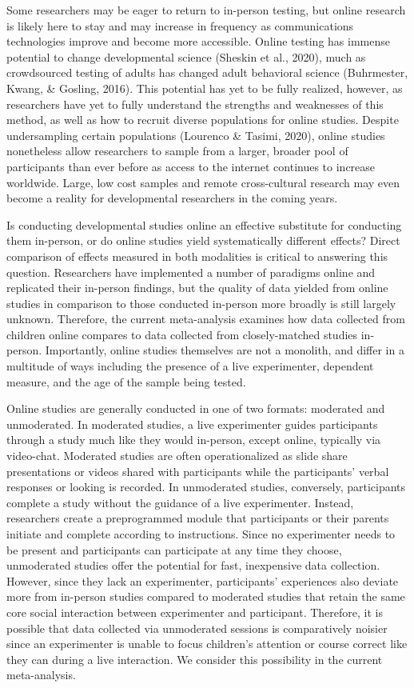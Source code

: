 \documentclass[
  man,floatsintext]{apa6}
\begin{document}
Some researchers may be eager to return to in-person testing, but online research is likely here to stay and may increase in frequency as communications technologies improve and become more accessible. Online testing has immense potential to change developmental science (Sheskin et al., 2020), much as crowdsourced testing of adults has changed adult behavioral science (Buhrmester, Kwang, \& Gosling, 2016). This potential has yet to be fully realized, however, as researchers have yet to fully understand the strengths and weaknesses of this method, as well as how to recruit diverse populations for online studies. Despite undersampling certain populations (Lourenco \& Tasimi, 2020), online studies nonetheless allow researchers to sample from a larger, broader pool of participants than ever before as access to the internet continues to increase worldwide. Large, low cost samples and remote cross-cultural research may even become a reality for developmental researchers in the coming years.

Is conducting developmental studies online an effective substitute for conducting them in-person, or do online studies yield systematically different effects? Direct comparison of effects measured in both modalities is critical to answering this question. Researchers have implemented a number of paradigms online and replicated their in-person findings, but the quality of data yielded from online studies in comparison to those conducted in-person more broadly is still largely unknown. Therefore, the current meta-analysis examines how data collected from children online compares to data collected from closely-matched studies in-person. Importantly, online studies themselves are not a monolith, and differ in a multitude of ways including the presence of a live experimenter, dependent measure, and the age of the sample being tested.

Online studies are generally conducted in one of two formats: moderated and unmoderated. In moderated studies, a live experimenter guides participants through a study much like they would in-person, except online, typically via video-chat. Moderated studies are often operationalized as slide share presentations or videos shared with participants while the participants' verbal responses or looking is recorded. In unmoderated studies, conversely, participants complete a study without the guidance of a live experimenter. Instead, researchers create a preprogrammed module that participants or their parents initiate and complete according to instructions. Since no experimenter needs to be present and participants can participate at any time they choose, unmoderated studies offer the potential for fast, inexpensive data collection. However, since they lack an experimenter, participants' experiences also deviate more from in-person studies compared to moderated studies that retain the same core social interaction between experimenter and participant. Therefore, it is possible that data collected via unmoderated sessions is comparatively noisier since an experimenter is unable to focus children's attention or course correct like they can during a live interaction. We consider this possibility in the current meta-analysis.
\end{document}
